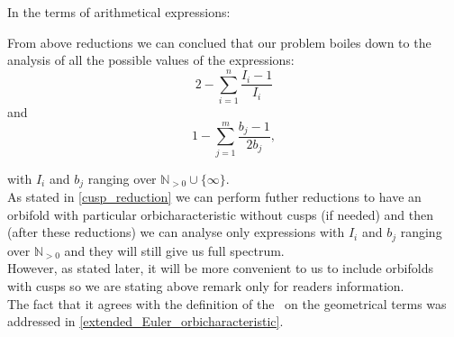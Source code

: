 In the terms of arithmetical expressions:
\begin{observation}\label{boils_down}
From above reductions we can conclued that our problem boiles down to the analysis of all
 the possible 
values of the expressions:
\begin{equation}\label{S2_sum}
2 - \sum_{i=1}^n \frac{I_i-1}{I_i}
\end{equation}
and 
\begin{equation}
1 - \sum_{j=1}^m \frac{b_j-1}{2b_j},
\end{equation}
\end{observation}
with $I_i$ and $b_j$ ranging over $\mathbb{N}_{>0}\cup \{\infty\}$. \\
As stated in \ref{cusp_reduction} we can perform futher reductions to have an orbifold with 
particular orbicharacteristic without cusps (if needed) and then (after these reductions) 
we can analyse only expressions with $I_i$ and $b_j$ ranging over $\mathbb{N}_{>0}$ and 
they will still give us full spectrum. \\ 
However, as stated later, it will be more convenient to us to include orbifolds with cusps 
so we are stating above remark only for readers information. \\ 
 The fact that it agrees with the definition of the \Eoc\ on the geometrical terms was 
addressed in \ref{extended_Euler_orbicharacteristic}. 








